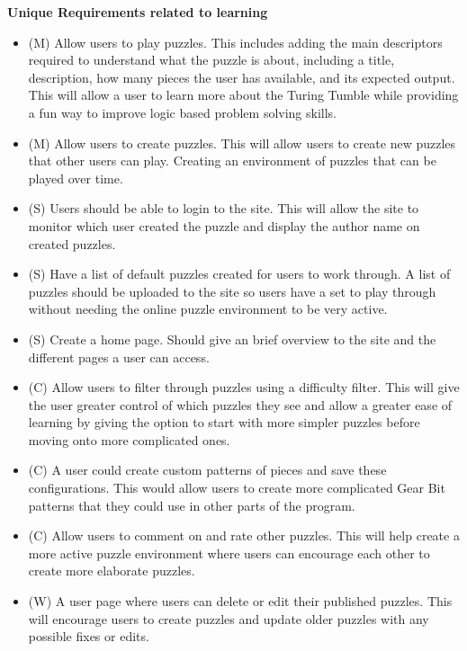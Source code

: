 \documentclass{l4proj}
\begin{document}
\textbf{Unique Requirements related to learning}
\begin{itemize}
    \item (M) Allow users to play puzzles. This includes adding the main descriptors required to understand what the puzzle is about, including a title, description, how many pieces the user has available, and its expected output. This will allow a user to learn more about the Turing Tumble while providing a fun way to improve logic based problem solving skills.
    \item (M) Allow users to create puzzles. This will allow users to create new puzzles that other users can play. Creating an environment of puzzles that can be played over time.
    \item (S) Users should be able to login to the site. This will allow the site to monitor which user created the puzzle and display the author name on created puzzles.
    \item (S) Have a list of default puzzles created for users to work through. A list of puzzles should be uploaded to the site so users have a set to play through without needing the online puzzle environment to be very active.
    \item (S) Create a home page. Should give an brief overview to the site and the different pages a user can access.
    \item (C) Allow users to filter through puzzles using a difficulty filter. This will give the user greater control of which puzzles they see and allow a greater ease of learning by giving the option to start with more simpler puzzles before moving onto more complicated ones.
    \item (C) A user could create custom patterns of pieces and save these configurations. This would allow users to create more complicated Gear Bit patterns that they could use in other parts of the program.
    \item (C) Allow users to comment on and rate other puzzles. This will help create a more active puzzle environment where users can encourage each other to create more elaborate puzzles.
    \item (W) A user page where users can delete or edit their published puzzles. This will encourage users to create puzzles and update older puzzles with any possible fixes or edits.
\end{itemize}
\end{document}
